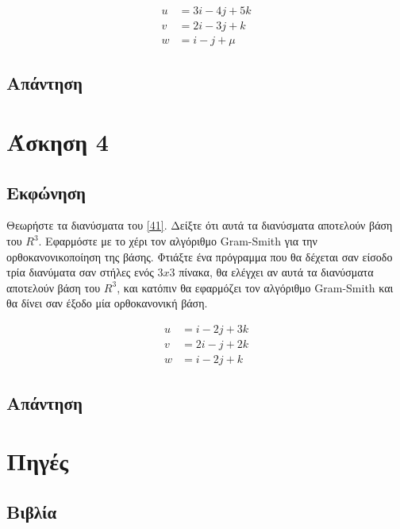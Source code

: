 \documentclass[14pt]{extreport}
\begin{document}
\begin{equation}
    \begin{aligned}
        u & = 3i - 4j + 5k \\
        v & = 2i - 3j + k  \\
        w & = i - j + \mu
    \end{aligned}\label{31}
\end{equation}

\newpage
\section{Απάντηση}


\chapter{Άσκηση 4}
\section{Εκφώνηση}

Θεωρήστε τα διανύσματα του \eqref{41}. Δείξτε ότι αυτά τα διανύσματα αποτελούν βάση του $R^{3}$. Εφαρμόστε με το χέρι τον αλγόριθμο Gram-Smith για την ορθοκανονικοποίηση της βάσης. Φτιάξτε ένα πρόγραμμα που θα δέχεται σαν είσοδο τρία διανύματα σαν στήλες ενός $3x3$ πίνακα, θα ελέγχει αν αυτά τα διανύσματα αποτελούν βάση του $R^{3}$, και κατόπιν θα εφαρμόζει τον αλγόριθμο Gram-Smith και θα δίνει σαν έξοδο μία ορθοκανονική βάση.

\begin{equation}
    \begin{aligned}
        u & = i - 2j + 3k \\
        v & = 2i - j + 2k \\
        w & = i - 2j + k
    \end{aligned}\label{41}
\end{equation}

\newpage
\section{Απάντηση}

\chapter{Πηγές}
\newpage

\section{Βιβλία}
\end{document}
